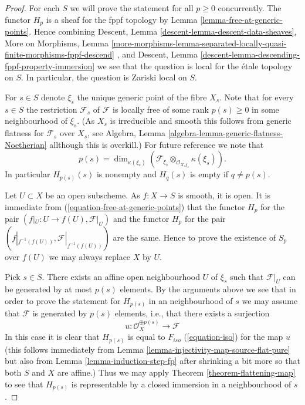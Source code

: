 \begin{proof}
For each $S$ we will prove the statement for all $p \geq 0$ concurrently.
The functor $H_p$ is a sheaf for the fppf topology by
Lemma \ref{lemma-free-at-generic-points}.
Hence combining
Descent, Lemma \ref{descent-lemma-descent-data-sheaves},
More on Morphisms, Lemma
\ref{more-morphisms-lemma-separated-locally-quasi-finite-morphisms-fppf-descend}
, and
Descent, Lemma \ref{descent-lemma-descending-fppf-property-immersion}
we see that the question is local for the \'etale topology on $S$.
In particular, the question is Zariski local on $S$.

\medskip\noindent
For $s \in S$ denote $\xi_s$ the unique generic point of the fibre $X_s$.
Note that for every $s \in S$ the restriction $\mathcal{F}_s$ of
$\mathcal{F}$ is locally free of some rank $p(s) \geq 0$ in some
neighbourhood of $\xi_s$. (As $X_s$ is irreducible
and smooth this follows from generic flatness for $\mathcal{F}_s$ over
$X_s$, see
Algebra, Lemma \ref{algebra-lemma-generic-flatness-Noetherian}
allthough this is overkill.) For future reference we note that
$$
p(s) =
\dim_{\kappa(\xi_s)}(
\mathcal{F}_{\xi_s} \otimes_{\mathcal{O}_{X, \xi_s}} \kappa(\xi_s)
).
$$
In particular $H_{p(s)}(s)$ is nonempty and $H_q(s)$ is empty
if $q \not = p(s)$.

\medskip\noindent
Let $U \subset X$ be an open subscheme.
As $f : X \to S$ is smooth, it is open.
It is immediate from (\ref{equation-free-at-generic-points})
that the functor $H_p$ for the pair $(f|_U : U \to f(U), \mathcal{F}|_U)$
and the functor $H_p$ for the pair
$(f|_{f^{-1}(f(U))}, \mathcal{F}|_{f^{-1}(f(U))})$
are the same. Hence to prove the existence of $S_p$ over $f(U)$ we may
always replace $X$ by $U$.

\medskip\noindent
Pick $s \in S$. There exists an affine open neighbourhood $U$
of $\xi_s$ such that $\mathcal{F}|_U$ can be generated by at most
$p(s)$ elements. By the arguments above we see that in order to prove
the statement for $H_{p(s)}$ in an neighbourhood of $s$ we may assume
that $\mathcal{F}$ is generated by $p(s)$ elements, i.e., that there exists
a surjection
$$
u : \mathcal{O}_X^{\oplus p(s)} \longrightarrow \mathcal{F}
$$
In this case it is clear that $H_{p(s)}$ is equal to $F_{iso}$
(\ref{equation-iso}) for the map $u$ (this follows immediately from
Lemma \ref{lemma-injectivity-map-source-flat-pure}
but also from
Lemma \ref{lemma-induction-step-fp}
after shrinking a bit more so that both $S$ and $X$ are affine.)
Thus we may apply
Theorem \ref{theorem-flattening-map}
to see that $H_{p(s)}$ is representable by a closed immersion in a
neighbourhood of $s$.


\end{proof}
